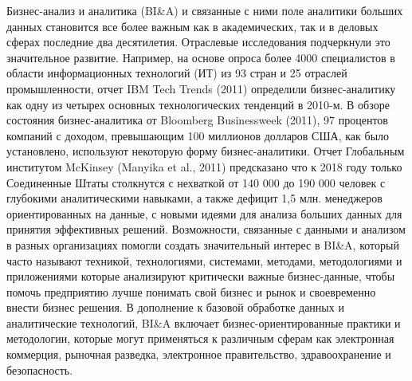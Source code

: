 Бизнес-анализ и аналитика (BI\&A) и связанные с ними
поле аналитики больших данных становится все более важным
как в академических, так и в деловых сферах
последние два десятилетия. Отраслевые исследования подчеркнули это
значительное развитие. Например, на основе опроса
более 4000 специалистов в области информационных технологий (ИТ) из 93
стран и 25 отраслей промышленности, отчет IBM Tech Trends
(2011) определили бизнес-аналитику как одну из четырех основных
технологических тенденций в 2010-м. В обзоре состояния
бизнес-аналитика от Bloomberg Businessweek (2011), 97 процентов компаний с доходом, превышающим 100 миллионов долларов США,
как было установлено, используют некоторую форму бизнес-аналитики. Отчет
Глобальным институтом McKinsey (Manyika et al., 2011) предсказано
что к 2018 году только Соединенные Штаты столкнутся с нехваткой
от 140 000 до 190 000 человек с глубокими аналитическими навыками,
а также дефицит 1,5 млн. менеджеров ориентированных на данные, с
новыми идеями для анализа больших данных для принятия эффективных решений.
Возможности, связанные с данными и анализом в разных
организациях помогли создать значительный интерес
в BI\&A, который часто называют техникой, технологиями,
системами, методами, методологиями и приложениями
которые анализируют критически важные бизнес-данные, чтобы помочь предприятию лучше
понимать свой бизнес и рынок и своевременно внести бизнес
решения. В дополнение к базовой обработке данных и
аналитические технологий, BI\&A включает бизнес-ориентированные
практики и методологии, которые могут применяться к различным
сферам как электронная коммерция, рыночная разведка,
электронное правительство, здравоохранение и безопасность.